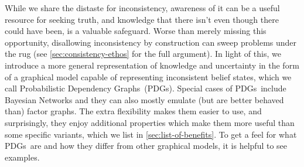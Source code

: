 \documentclass{article}
\newcommand{\modelnames}{Probabilistic Dependency Graphs}
\newcommand{\MNs}{PDGs}
\begin{document}
	While we share the distaste for inconsistency, awareness of it can be a useful resource for seeking truth, and knowledge that there isn't even though there could have been, is a valuable safeguard. Worse than merely missing this opportunity, disallowing inconsistency by construction can sweep problems under the rug (see \cref{sec:consistency-ethos} for the full argument). In light of this, we introduce a more general representation of knowledge and uncertainty in the form of a graphical model capable of representing inconsistent belief states, which we call \modelnames\ (\MNs). Special cases of \MNs\ include Bayesian Networks and they can also mostly emulate (but are better behaved than) factor graphs. The extra flexibility makes them easier to use, and surprisingly, they enjoy additional properties which make them more useful than some specific variants, which we list in \cref{sec:list-of-benefits}.
	To get a feel for what \MNs\ are and how they differ from other graphical models, it is helpful to see examples.
	

\end{document}
